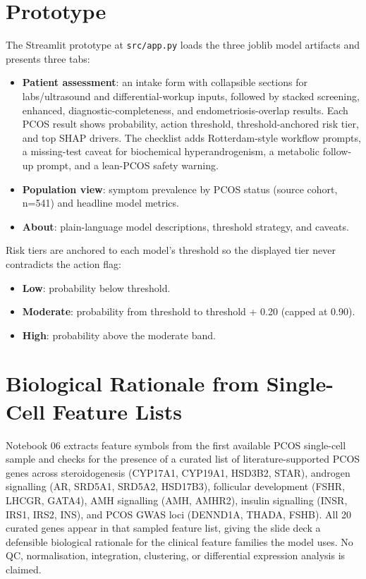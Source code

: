 \documentclass[11pt]{article}
\newcommand{\code}[1]{\texttt{\small #1}}
\begin{document}
\section{Prototype}

The Streamlit prototype at \code{src/app.py} loads the three joblib model artifacts and presents three tabs:

\begin{itemize}
  \item \textbf{Patient assessment}: an intake form with collapsible sections for labs/ultrasound and differential-workup inputs, followed by stacked screening, enhanced, diagnostic-completeness, and endometriosis-overlap results. Each PCOS result shows probability, action threshold, threshold-anchored risk tier, and top SHAP drivers. The checklist adds Rotterdam-style workflow prompts, a missing-test caveat for biochemical hyperandrogenism, a metabolic follow-up prompt, and a lean-PCOS safety warning.
  \item \textbf{Population view}: symptom prevalence by PCOS status (source cohort, n=541) and headline model metrics.
  \item \textbf{About}: plain-language model descriptions, threshold strategy, and caveats.
\end{itemize}

Risk tiers are anchored to each model's threshold so the displayed tier never contradicts the action flag:

\begin{itemize}
  \item \textbf{Low}: probability below threshold.
  \item \textbf{Moderate}: probability from threshold to threshold + 0.20 (capped at 0.90).
  \item \textbf{High}: probability above the moderate band.
\end{itemize}

\section{Biological Rationale from Single-Cell Feature Lists}

Notebook 06 extracts feature symbols from the first available PCOS single-cell sample and checks for the presence of a curated list of literature-supported PCOS genes across steroidogenesis (CYP17A1, CYP19A1, HSD3B2, STAR), androgen signalling (AR, SRD5A1, SRD5A2, HSD17B3), follicular development (FSHR, LHCGR, GATA4), AMH signalling (AMH, AMHR2), insulin signalling (INSR, IRS1, IRS2, INS), and PCOS GWAS loci (DENND1A, THADA, FSHB). All 20 curated genes appear in that sampled feature list, giving the slide deck a defensible biological rationale for the clinical feature families the model uses. No QC, normalisation, integration, clustering, or differential expression analysis is claimed.
\end{document}
